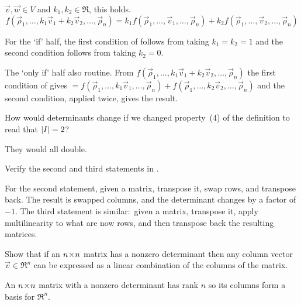 \begin{exercises}
     \( \vec{v},\vec{w}\in V \) and \( k_1,k_2\in\Re \), this holds.
      \begin{equation*}
         f(\vec{\rho}_1,\dots,k_1\vec{v}_1+k_2\vec{v}_2,
           \dots,\vec{\rho}_n)
         =
         k_1f(\vec{\rho}_1,\dots,\vec{v}_1,\dots,\vec{\rho}_n)+
         k_2f(\vec{\rho}_1,\dots,\vec{v}_2,\dots,\vec{\rho}_n)
       \end{equation*}
       \begin{answer}
         For the `if' half, the first condition of 
          follows from taking $k_1=k_2=1$
         and the second condition follows from taking $k_2=0$.

         The `only if' half also routine.
         From
         $
           f(\vec{\rho}_1,\dots,k_1\vec{v}_1+k_2\vec{v}_2,
             \dots,\vec{\rho}_n)
         $
         the first condition of  gives
         $
           =
           f(\vec{\rho}_1,\dots,k_1\vec{v}_1,\dots,\vec{\rho}_n)+
           f(\vec{\rho}_1,\dots,k_2\vec{v}_2,\dots,\vec{\rho}_n)
         $
         and the second condition, applied twice, gives the 
         result. 
       \end{answer}
  \item 
    How would determinants change if we changed property~(4) of the
    definition to read that \( \deter{I}=2 \)?
    \begin{answer}
       They would all double.
    \end{answer}
  \item 
    Verify the second and third 
    statements in .
    \begin{answer}
      For the second statement, 
      given a matrix, transpose it, swap rows, and transpose back.
      The result is swapped columns, and the determinant changes by a factor
      of \( -1 \).
      The third statement is similar:~given 
      a matrix, transpose it, apply multilinearity to what are now
      rows, and then transpose back the resulting matrices.
    \end{answer}
  \recommended \item
    Show that if an \( n \! \times \! n \) matrix has a nonzero determinant
    then any column vector
    \( \vec{v}\in\Re^n \) can be expressed as a linear combination
    of the columns of the matrix.
    \begin{answer}
      An \( n \! \times \! n \) matrix with a nonzero determinant has rank
      \( n \) so its columns form a basis for \( \Re^n \).  

\end{answer}
\end{exercises}
